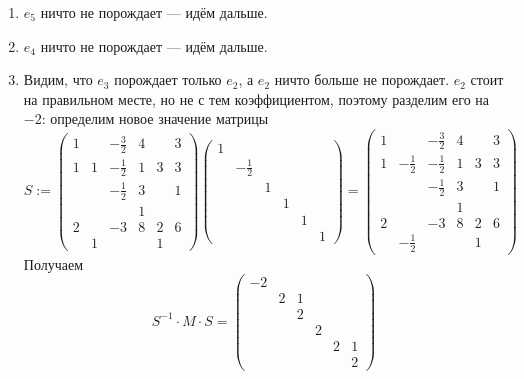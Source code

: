 \documentclass[12pt,a4paper]{article}
\begin{document}
\begin{problem*}
\begin{enumerate}
            \item $e_5$ ничто не порождает --- идём дальше.

            \item $e_4$ ничто не порождает --- идём дальше.

            \item Видим, что $e_3$ порождает только $e_2$, а $e_2$ ничто больше не порождает. $e_2$ стоит на правильном месте, но не с тем коэффициентом, поэтому разделим его на $-2$: определим новое значение матрицы
                \[
                    S :=
                    \begin{pmatrix}
                        1&& -\frac{3}{2}& 4&& 3\\
                        1& 1& -\frac{1}{2}& 1& 3& 3\\
                        && -\frac{1}{2}& 3&& 1\\
                        &&& 1&&\\
                        2&& -3& 8& 2& 6\\
                        & 1&&& 1&
                    \end{pmatrix}
                    \begin{pmatrix}
                        1&&&&&\\
                        & -\frac{1}{2}&&&&\\
                        &&1&&&\\
                        &&&1&&\\
                        &&&&1&\\
                        &&&&&1
                    \end{pmatrix}
                    =
                    \begin{pmatrix}
                        1&& -\frac{3}{2}& 4&& 3\\
                        1& -\frac{1}{2}& -\frac{1}{2}& 1& 3& 3\\
                        && -\frac{1}{2}& 3&& 1\\
                        &&& 1&&\\
                        2&& -3& 8& 2& 6\\
                        & -\frac{1}{2}&&& 1&
                    \end{pmatrix}
                \]
                Получаем
                \[
                    S^{-1} \cdot M \cdot S =
                    \begin{pmatrix}
                        -2&&&&&\\
                        &2& 1&&&\\
                        &&2&&&\\
                        &&&2&&\\
                        &&&&2&1\\
                        &&&&&2 
                    \end{pmatrix}
                \]
        \end{enumerate}


\end{problem*}
\end{document}
